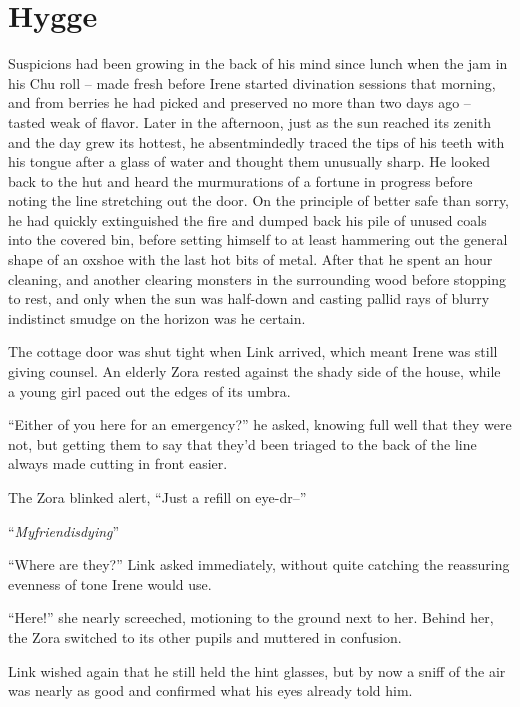 \documentclass[../FGP.tex]{subfiles}
\begin{document}
\section{Hygge}
\begin{fragment}Suspicions had been growing in the back of his mind since lunch when the jam in his Chu roll -- made fresh before Irene started divination sessions that morning, and from berries he had picked and preserved no more than two days ago -- tasted weak of flavor. Later in the afternoon, just as the sun reached its zenith and the day grew its hottest, he absentmindedly traced the tips of his teeth with his tongue after a glass of water and thought them unusually sharp. He looked back to the hut and heard the murmurations of a fortune in progress before noting the line stretching out the door. On the principle of better safe than sorry, he had quickly extinguished the fire and dumped back his pile of unused coals into the covered bin, before setting himself to at least hammering out the general shape of an oxshoe with the last hot bits of metal. After that he spent an hour cleaning, and another clearing monsters in the surrounding wood before stopping to rest, and only when the sun was half-down and casting pallid rays of blurry indistinct smudge on the horizon was he certain.

The cottage door was shut tight when Link arrived, which meant Irene was still giving counsel. An elderly Zora rested against the shady side of the house, while a young girl paced out the edges of its umbra.

``Either of you here for an emergency?'' he asked, knowing full well that they were not, but getting them to say that they'd been triaged to the back of the line always made cutting in front easier.

The Zora blinked alert, ``Just a refill on eye-dr--''  

``\emph{Myfriendisdying}'' 

``Where are they?'' Link asked immediately, without quite catching the reassuring evenness of tone Irene would use.  %

``Here!'' she nearly screeched, motioning to the ground next to her. Behind her, the Zora  switched to its other pupils and muttered in confusion.

Link wished again that he still held the hint glasses, but by now a sniff of the air was nearly as good and confirmed what his eyes already told him.


\end{fragment}
\end{document}

